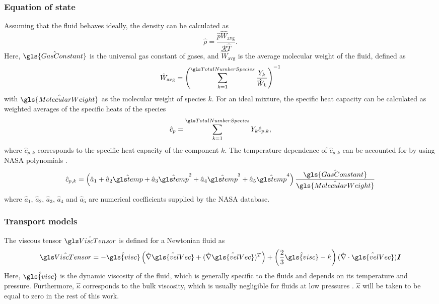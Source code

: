 \subsubsection{Equation of state}
Assuming that the fluid behaves ideally, the density can be calculated as
\begin{equation}
	\hat \rho = \frac{\hat{p}  \hat{W}_{\text{avg}}}{\mathcal{R} \hat{T} }. \label{eq:IdealGassDimensional}
\end{equation}
Here, $\hat{\gls{GasConstant}}$ is the universal gas constant of gases, and $\hat W_{\text{avg}}$ is the average molecular weight of the fluid, defined as
\begin{equation}
	\hat W_{\text{avg}} = \left( \SumOvAllns \frac{Y_k}{\hat W_k} \right)^{-1}
\end{equation}
with $\hat{\gls{MolecularWeight}}$ as the molecular weight of species $k$.  For an ideal mixture, the specific heat capacity can be calculated as weighted averages of the specific heats of the species 
\begin{equation}
	\hat c_p = \SumOvAllns Y_k \hat{c}_{p,k},%
\end{equation}
where $\hat{c}_{p,k}$ corresponds to the specific heat capacity of the component $k$. The temperature dependence of $\hat{c}_{p,k}$ can be accounted for by using NASA polynomials \citep{mcbrideNASAThermodynamicData1993}.
\begin{equation}
	\hat{c}_{p,k} = \left(\hat a_1 + \hat  a_2\glsHat{temp} +\hat  a_3\glsHat{temp}^2 +\hat  a_4\glsHat{temp}^3+\hat a_5\glsHat{temp}^4\right)\frac{\hat{\gls{GasConstant}}}{\hat{\gls{MolecularWeight}}}
\end{equation}
where $\hat a_1$, $\hat a_2$, $\hat a_3$, $\hat a_4$ and $\hat a_5$ are numerical coefficients supplied by the NASA database.
\subsubsection{Transport models}
The viscous tensor $\glsHat{ViscTensor}$ is defined for a Newtonian fluid as
\begin{equation}
	\glsHat{ViscTensor}= -\hat{\gls{visc}}\left( \hat\nabla \hat{\gls{velVec}} +(\hat\nabla\hat{\gls{velVec}})^T\right)  + \left(\frac{2}{3}\hat{\gls{visc}} - \hat \kappa \right) (\hat\nabla\cdot \hat{\gls{velVec}})\mytensor{I}
\end{equation}
Here, $\hat{\gls{visc}}$ is the dynamic viscosity of the fluid, which is generally specific to the fluids and depends on its temperature and pressure. Furthermore, $\hat \kappa$ corresponds to the bulk viscosity, which is usually negligible for fluids at low pressures \citep{birdTransportPhenomena1960}. $\hat \kappa$ will be taken to be equal to zero in the rest of this work.

